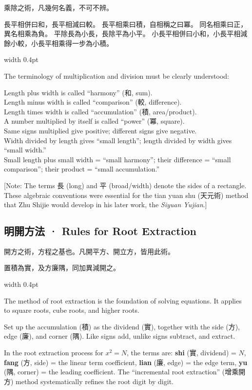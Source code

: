 \documentclass[10pt,a4paper]{article}
\newlength{\cnwidth}
\newlength{\enwidth}
\newcommand{\bilingual}[2]{%
  \noindent%
  \begin{minipage}[t]{\cnwidth}%
    #1%
  \end{minipage}%
  \hfill\vrule width 0.4pt\hfill%
  \begin{minipage}[t]{\enwidth}%
    #2%
  \end{minipage}%
  \par\smallskip%
}
\newcommand{\bilingualsubsection}[2]{%
  \subsection*{#1 · #2}
}
\newcommand{\transnote}[1]{%
  \par\smallskip\noindent\textcolor{notecolor}{\small[Note: #1]}\par\smallskip
}
\begin{document}
\bilingual{%
  乘除之術，凡幾何名義，不可不辨。

  長平相併曰和，長平相減曰較。
  長平相乘曰積，自相稱之曰冪。
  同名相乘曰正，異名相乘為負。
  平除長為小長，長除平為小平。
  小長平相併曰小和，小長平相減餘小較，小長平相乘得一步為小積。
}{%
  The terminology of multiplication and division must be clearly understood:

  Length plus width is called ``harmony'' (和, sum).\\
  Length minus width is called ``comparison'' (較, difference).\\
  Length times width is called ``accumulation'' (積, area/product).\\
  A number multiplied by itself is called ``power'' (冪, square).\\
  Same signs multiplied give positive; different signs give negative.\\
  Width divided by length gives ``small length''; length divided by width gives ``small width.''\\
  Small length plus small width = ``small harmony''; their difference = ``small comparison'';
  their product = ``small accumulation.''
}

\transnote{The terms 長 (long) and 平 (broad/width) denote the sides of a rectangle.
These algebraic conventions were essential for the tian yuan shu (天元術) method
that Zhu Shijie would develop in his later work, the \textit{Siyuan Yujian}.}

\bilingualsubsection{明開方法}{Rules for Root Extraction}

\bilingual{%
  開方之術，方程之基也。凡開平方、開立方，皆用此術。

  置積為實，及方廉隅，同加異減開之。
}{%
  The method of root extraction is the foundation of solving equations.
  It applies to square roots, cube roots, and higher roots.

  Set up the accumulation (積) as the dividend (實), together with the side (方),
  edge (廉), and corner (隅). Like signs add, unlike signs subtract, and extract.

  In the root extraction process for $x^2 = N$, the terms are:
  \textbf{shi} (實, dividend) = $N$,
  \textbf{fang} (方, side) = the linear term coefficient,
  \textbf{lian} (廉, edge) = the edge term,
  \textbf{yu} (隅, corner) = the leading coefficient.
  The ``incremental root extraction'' (增乘開方) method systematically
  refines the root digit by digit.
}
\end{document}
